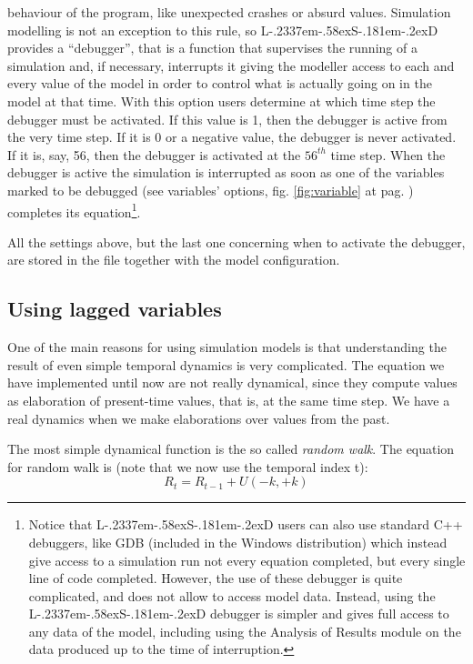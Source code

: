 \documentclass [11pt,a4paper] {book}
\def\LsD{{L\kern-.2337em\lower-.58ex\hbox{S}\kern-.181em\lower-.2ex\hbox{D}}\xspace}
\begin{document}
\begin{itemize}
  behaviour of the program, like unexpected crashes or absurd values. Simulation
  modelling is not an exception to this rule, so \LsD provides a ``debugger'', that is a
  function that supervises the running of a simulation and, if necessary, interrupts it
  giving the modeller access to each and every value of the model in order to control
  what is actually going on in the model at that time. With this option users determine
  at which time step the debugger must be activated. If this value is 1, then the debugger
  is active from the very time step. If it is 0 or a negative value, the debugger is
  never activated. If it is, say, 56, then the debugger is activated at the $56^{th}$ time
  step. When the debugger is active the simulation is interrupted as soon as one of the
  variables marked to be debugged (see variables' options, fig. \ref{fig:variable} at
  pag. \pageref{fig:variable}) completes its equation\footnote{Notice that \LsD users can also use standard
  C++ debuggers, like GDB (included in the Windows distribution) which instead give access to a simulation run not every
  equation completed, but every single line of code completed. However, the use of these debugger is quite complicated, and does not allow to access model data. Instead, using the \LsD debugger is simpler and gives full access to any data of the model, including using the Analysis of Results module on the data produced up to the time of interruption.}.

\end{itemize}


All the settings above, but the last one concerning when to activate the debugger, are
stored in the file together with the model configuration.



\subsection{Using lagged variables}
One of the main reasons for using simulation models is that understanding the result of
even simple temporal dynamics is very complicated. The equation we have implemented until
now are not really dynamical, since they compute values as elaboration of present-time
values, that is, at the same time step. We have a real dynamics when we make elaborations
over values from the past.

The most simple dynamical function is the so called \emph{random walk}. The equation for
random walk is (note that we now use the temporal index t):
\[
R_t=R_{t-1}+U(-k,+k)
\]
\end{document}
